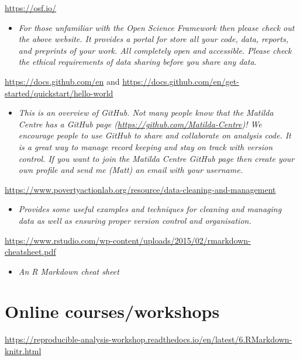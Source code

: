 \documentclass[
]{book}
\providecommand{\tightlist}{%
  \setlength{\itemsep}{0pt}\setlength{\parskip}{0pt}}
\begin{document}
\url{https://osf.io/}

\begin{itemize}
\tightlist
\item
  \emph{For those unfamiliar with the Open Science Framework then please check out the above website. It provides a portal for store all your code, data, reports, and preprints of your work. All completely open and accessible. Please check the ethical requirements of data sharing before you share any data.}
\end{itemize}

\url{https://docs.github.com/en} and \url{https://docs.github.com/en/get-started/quickstart/hello-world}

\begin{itemize}
\tightlist
\item
  \emph{This is an overview of GitHub. Not many people know that the Matilda Centre has a GitHub page (\url{https://github.com/Matilda-Centre})! We encourage people to use GitHub to share and collaborate on analysis code. It is a great way to manage record keeping and stay on track with version control. If you want to join the Matilda Centre GitHub page then create your own profile and send me (Matt) an email with your username.}
\end{itemize}

\url{https://www.povertyactionlab.org/resource/data-cleaning-and-management}

\begin{itemize}
\tightlist
\item
  \emph{Provides some useful examples and techniques for cleaning and managing data as well as ensuring proper version control and organisation.}
\end{itemize}

\url{https://www.rstudio.com/wp-content/uploads/2015/02/rmarkdown-cheatsheet.pdf}

\begin{itemize}
\tightlist
\item
  \emph{An R Markdown cheat sheet}
\end{itemize}

\section{Online courses/workshops}\label{online-coursesworkshops}

\url{https://reproducible-analysis-workshop.readthedocs.io/en/latest/6.RMarkdown-knitr.html}
\end{document}
